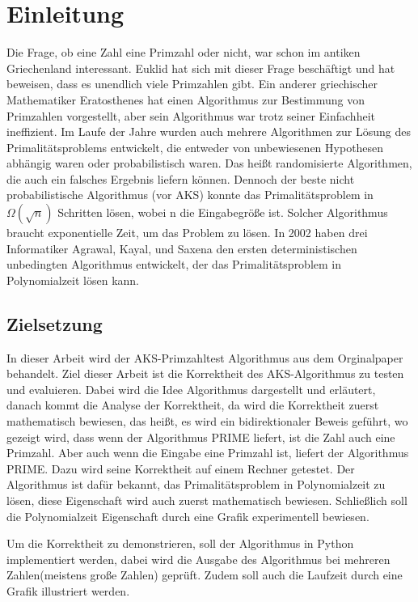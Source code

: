 \documentclass[12pt,oneside]{article}
\theoremstyle{remark}
\theoremstyle{definition}
\begin{document}
\section{Einleitung} \label{einleitung}
Die Frage, ob eine Zahl eine Primzahl oder nicht, war schon im antiken Griechenland interessant. Euklid hat sich mit dieser Frage beschäftigt und hat beweisen, dass es unendlich viele Primzahlen gibt. Ein anderer griechischer Mathematiker Eratosthenes hat einen Algorithmus zur Bestimmung von Primzahlen vorgestellt, aber sein Algorithmus war trotz seiner Einfachheit ineffizient. Im Laufe der Jahre wurden auch mehrere Algorithmen zur Lösung des Primalitätsproblems entwickelt, die entweder von unbewiesenen Hypothesen abhängig waren oder probabilistisch waren. Das heißt randomisierte Algorithmen, die auch ein falsches Ergebnis liefern können. Dennoch der beste nicht probabilistische Algorithmus (vor AKS) konnte das Primalitätsproblem in $ \Omega(\sqrt{n}) $ Schritten lösen, wobei n die Eingabegröße ist. Solcher Algorithmus braucht exponentielle Zeit, um das Problem zu lösen. In 2002 haben drei Informatiker Agrawal, Kayal, und Saxena den ersten deterministischen unbedingten Algorithmus entwickelt, der das Primalitätsproblem in Polynomialzeit lösen kann.\newline
\subsection{Zielsetzung}
In dieser Arbeit wird der AKS-Primzahltest Algorithmus aus dem Orginalpaper behandelt. Ziel dieser Arbeit ist die Korrektheit des AKS-Algorithmus zu testen und evaluieren. Dabei wird die Idee Algorithmus dargestellt und erläutert, danach kommt die Analyse der Korrektheit, da wird die Korrektheit zuerst mathematisch bewiesen, das heißt, es wird ein bidirektionaler Beweis geführt, wo gezeigt wird, dass wenn der Algorithmus PRIME liefert, ist die Zahl auch eine Primzahl. Aber auch wenn die Eingabe eine Primzahl ist, liefert der Algorithmus PRIME. Dazu wird seine Korrektheit auf einem Rechner getestet. Der Algorithmus ist dafür bekannt, das Primalitätsproblem in Polynomialzeit zu lösen, diese Eigenschaft wird auch zuerst mathematisch bewiesen. Schließlich soll die Polynomialzeit Eigenschaft durch eine Grafik experimentell bewiesen.  

Um die Korrektheit zu demonstrieren, soll der Algorithmus in Python implementiert werden, dabei wird die Ausgabe des Algorithmus bei mehreren Zahlen(meistens große Zahlen) geprüft. Zudem soll auch die Laufzeit durch eine Grafik illustriert werden.  
\end{document}
